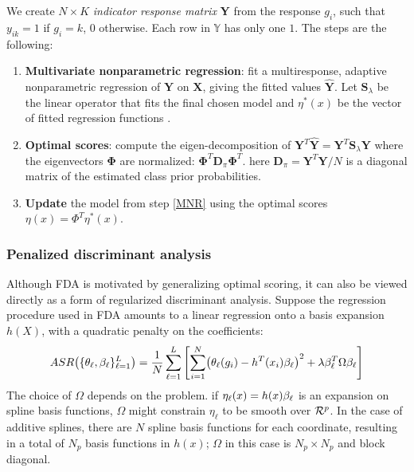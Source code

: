 We create $N \times K$ \textit{indicator response matrix} \textbf{Y} from the response $g_i$, such that $y_{ik} = 1$ if $g_i =k$, $0$ otherwise. Each row in $\mathbb{Y}$ has only one $1$.
The steps are the following:
\begin{enumerate}
\item \textbf{Multivariate nonparametric regression}: fit a multiresponse, adaptive nonparametric regression of $\mathbf{Y}$ on $\mathbf{X}$, giving the fitted values $\mathbf{\hat{Y}}$. Let $\mathbf{S}_\lambda$ be the linear operator that fits the final chosen model and $\eta^*(x)$ be the vector of fitted regression functions \label{MNR}.
\item \textbf{Optimal scores}: compute the eigen-decomposition of $\mathbf{Y}^T\mathbf{\hat{Y}}=\mathbf{Y}^T\mathbf{S}_\lambda \mathbf{Y}$ where the eigenvectors $\mathbf{\Phi}$ are normalized: $\mathbf{\Phi}^T\mathbf{D}_\pi\mathbf{\Phi}^T$. here $\mathbf{D}_\pi = \mathbf{Y}^T\mathbf{Y}/N$ is a diagonal matrix of the estimated class prior probabilities.
\item \textbf{Update} the model from step \autoref{MNR} using the optimal scores $\eta(x) = \Phi^T\eta^*(x)$.
\end{enumerate}  
\subsubsection{Penalized discriminant analysis}
Although FDA is motivated by generalizing optimal scoring, it can also be viewed directly as a form of regularized discriminant analysis. Suppose the regression procedure used in FDA amounts to a linear regression onto a basis expansion $h(X)$, with a quadratic penalty on the coefficients:
\begin{equation}
ASR\br{\{ \theta_\ell, \be_\ell\}_{\ell=1}^L} = \frac{1}{N}\sum_{\ell=1}^L\left[\sum_{i=1}^N \br{\theta_\ell(g_i) - h^T(x_i)\be_\ell}^2 + \lambda \be_\ell^T\Omega \be_\ell\right]
\end{equation}
The choice of $\Omega$ depends on the problem. if $\eta_\ell(x) = h(x)\mathbf{\beta}_\ell$ is an expansion on spline basis functions, $\Omega$ might constrain $\eta_\ell$ to be smooth over $\CMcal{R}^p$. In the case of additive splines, there are $N$ spline basis functions for each coordinate, resulting in a total of $N_p$ basis functions in $h(x)$; $\Omega$ in this case is $N_p \times N_p$ and block diagonal.

